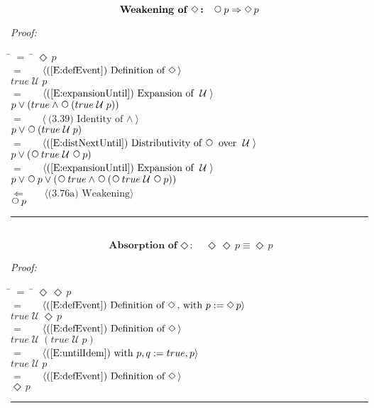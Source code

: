 \documentclass[fleqn, leqno]{article}
\newcommand{\lgap}{2pt}                             %
\newcommand{\mymathindent}{24pt}                    %
\newcommand{\Until}{\;\mathcal{U}\;}
\newcommand{\Next}{\;\,\text{\raisebox{3.5pt}{\circle{6}}}}
\newcommand{\Event}{\Diamond\,}
\newcommand{\myqed}{\hfill\rule[-.23ex]{1.2ex}{2.0ex}}
\newcommand{\Gll} {\langle}                         %
\newcommand{\Ggg} {\rangle}                         %
\newcommand{\Hint}[1]     {\ \ \ $\Gll              \mbox{#1} \Ggg$ }   %
\begin{document}
\begin{equation}\label{E:nextEvent}
\textbf{Weakening of $\Event$:}\quad \Next p \Rightarrow \Event p
\end{equation}

\emph{Proof:}
\begin{tabbing}
\hspace{\mymathindent} \= $= \;$ \= \kill
  \> \>   $\Event p$\\[\lgap]
  \> $=$  \>  \Hint{(\ref{E:defEvent}) Definition of $\Event$}\\[\lgap]
  \> \>   $true \Until p$\\[\lgap]
  \> $=$  \>  \Hint{(\ref{E:expansionUntil}) Expansion of $\Until$}\\[\lgap]
  \> \>   $p \lor (true \land \Next(true \Until p))$\\[\lgap]
  \> $=$  \>  \Hint{(3.39) Identity of $\land$}\\[\lgap]
  \> \>   $p \lor \Next(true \Until p)$\\[\lgap]
  \> $=$  \>  \Hint{(\ref{E:distNextUntil}) Distributivity of $\Next$ over $\Until$}\\[\lgap]
  \> \>   $p \lor (\Next true \Until \Next p)$\\[\lgap]
  \> $=$  \>  \Hint{(\ref{E:expansionUntil}) Expansion of $\Until$}\\[\lgap]
  \> \>   $p \lor \Next p \lor (\Next true \land \Next(\Next true \Until \Next p))$\\[\lgap]
  \> $\Leftarrow$ \> \Hint{(3.76a) Weakening}\\[\lgap]
  \> \>   $\Next p$\\[\lgap]
\end{tabbing}
\myqed\\[\lgap]


\begin{equation}\label{E:IdemEvent}
\textbf{Absorption of $\Event$:}\quad \Event\Event p \equiv \Event p
\end{equation}

\emph{Proof:}
\begin{tabbing}
\hspace{\mymathindent} \= $= \;$ \= \kill
  \> \>   $\Event\Event p$\\[\lgap]
  \> $=$  \>  \Hint{(\ref{E:defEvent}) Definition of $\Event$, with $p := \Event p$}\\[\lgap]
  \> \>   $true \Until \Event p$\\[\lgap]
  \> $=$  \>  \Hint{(\ref{E:defEvent}) Definition of $\Event$}\\[\lgap]
  \> \>   $true \Until (true \Until p)$\\[\lgap]
  \> $=$  \>  \Hint{(\ref{E:untilIdem}) with $p,q := true,p$}\\[\lgap]
  \> \>   $true \Until p$\\[\lgap]
  \> $=$  \>  \Hint{(\ref{E:defEvent}) Definition of $\Event$}\\[\lgap]
  \> \>   $\Event p$\\[\lgap]
\end{tabbing}
\myqed\\[\lgap]
\end{document}
